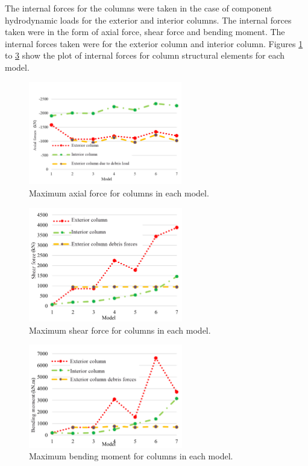 \documentclass{cup-pan}
\begin{document}
The internal forces for the columns were taken in the case of component hydrodynamic loads for the exterior and interior columns. The internal forces taken were in the form of axial force, shear force and bending moment. The internal forces taken were for the exterior column and interior column. Figures \ref{fig:maxaxialcolumn} to \ref{fig:maxmomentcolumn} show the plot of internal forces for column structural elements for each model.

\begin{figure}[H]
\centering
\includegraphics[width=0.6\textwidth]{Picture15_engels.png}
\caption{Maximum axial force for columns in each model.}
\label{fig:maxaxialcolumn}
\end{figure}

\begin{figure}[H]
\centering
\includegraphics[width=0.6\textwidth]{Picture16_engels.png}
\caption{Maximum shear force for columns in each model.}
\label{fig:maxshearcolumn}
\end{figure}

\begin{figure}[H]
\centering
\includegraphics[width=0.6\textwidth]{Picture17_engels.png}
\caption{Maximum bending moment for columns in each model.}
\label{fig:maxmomentcolumn}
\end{figure}
\end{document}
